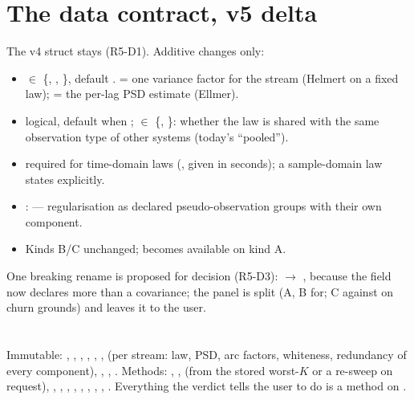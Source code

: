 \section{The data contract, v5 delta}
\label{sec:contractdelta}

The v4 struct stays (R5-D1). Additive changes only:
\begin{itemize}
\item {} $\in$ \{, , \}, default .  = one variance factor for the stream (Helmert on a fixed law);  = the per-lag PSD estimate (Ellmer).
\item {} logical, default  when ;  $\in$ \{, \}: whether the law is shared with the same observation type of other systems (today's ``pooled'').
\item {} required for time-domain laws (,  given in seconds); a sample-domain law states  explicitly.
\item {}:  --- regularisation as declared pseudo-observation groups with their own component.
\item Kinds B/C unchanged;  becomes available on kind A.
\end{itemize}
One breaking rename is proposed for decision (R5-D3):  $\to$ , because the field now declares more than a covariance; the panel is split (A, B for; C against on churn grounds) and leaves it to the user.

\section{}

Immutable: , , , , , ,  (per stream: law, PSD, arc factors, whiteness, redundancy of every component), , , . Methods: , ,  (from the stored worst-$K$ or a re-sweep on request), , , , , , , , , . Everything the verdict tells the user to do is a method on .

